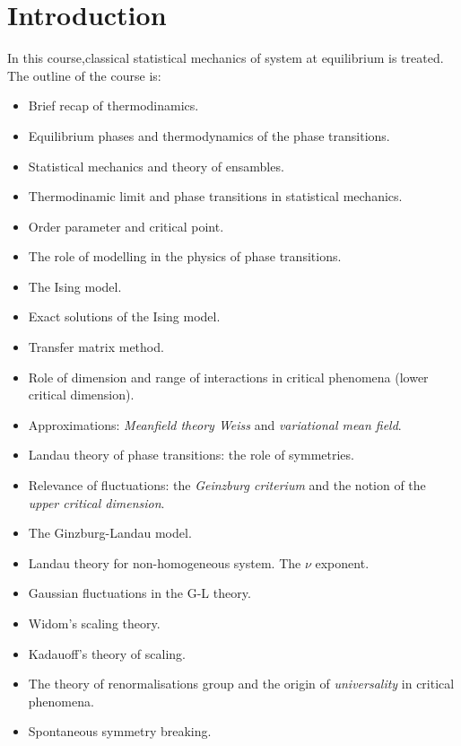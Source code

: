 \documentclass[11pt, a4paper, twoside, openright]{book}
\begin{document}

\frontmatter


\tableofcontents


\pagestyle{plain}

\chapter{Introduction}

In this course,classical statistical mechanics of system at equilibrium is treated. The outline of the course is:

\begin{itemize}
\item Brief recap of thermodinamics.
\item Equilibrium phases and thermodynamics of the phase transitions.
\item Statistical mechanics and theory of ensambles.
\item Thermodinamic limit and phase transitions in statistical mechanics.
\item Order parameter and critical point.
\item The role of modelling in the physics of phase transitions.
\item The Ising model.
\item Exact solutions of the Ising model.
\item Transfer matrix method.
\item Role of dimension and range of interactions in critical phenomena (lower critical dimension).
\item Approximations: \emph{Meanfield theory Weiss} and \emph{variational mean field}.
\item Landau theory of phase transitions: the role of symmetries.
\item Relevance of fluctuations: the \emph{Geinzburg criterium} and the notion of the \emph{upper critical dimension}.
\item The Ginzburg-Landau model.
\item Landau theory for non-homogeneous system. The \( \nu  \) exponent.
\item Gaussian fluctuations in the G-L theory.
\item Widom's scaling theory.
\item Kadauoff's theory of scaling.
\item The theory of renormalisations group and the origin of \emph{universality} in critical phenomena.
\item Spontaneous symmetry breaking.

\end{itemize}
\end{document}
